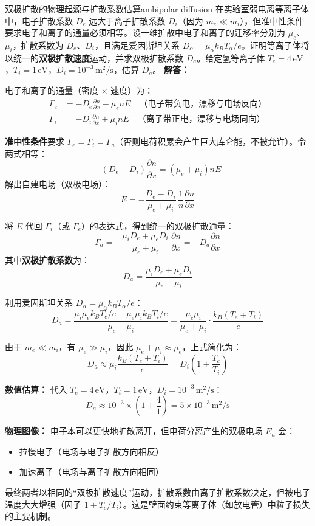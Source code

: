 \begin{example}{双极扩散的物理起源与扩散系数估算}{ambipolar-diffusion}
在实验室弱电离等离子体中，电子扩散系数 $D_e$ 远大于离子扩散系数 $D_i$（因为 $m_e\ll m_i$），但准中性条件要求电子和离子的通量必须相等。设一维扩散中电子和离子的迁移率分别为 $\mu_e$、$\mu_i$，扩散系数为 $D_e$、$D_i$，且满足爱因斯坦关系 $D_\alpha = \mu_\alpha k_{\!B}T_\alpha/e$。证明等离子体将以统一的\textbf{双极扩散速度}运动，并求双极扩散系数 $D_a$。给定氢等离子体 $T_e=4\,\mathrm{eV}$，$T_i=1\,\mathrm{eV}$，$D_i=10^{-3}\,\mathrm{m^2/s}$，估算 $D_a$。
\tcblower
\textbf{解答：}

电子和离子的通量（密度 $\times$ 速度）为：
\begin{align*}
\Gamma_e &= -D_e\frac{\partial n}{\partial x} - \mu_e n E \quad \text{（电子带负电，漂移与电场反向）}\\
\Gamma_i &= -D_i\frac{\partial n}{\partial x} + \mu_i n E \quad \text{（离子带正电，漂移与电场同向）}
\end{align*}

\textbf{准中性条件}要求 $\Gamma_e = \Gamma_i = \Gamma_a$（否则电荷积累会产生巨大库仑能，不被允许）。令两式相等：
\[
-(D_e - D_i)\frac{\partial n}{\partial x} = (\mu_e + \mu_i)nE
\]
解出自建电场（双极电场）：
\[
E = -\frac{D_e - D_i}{\mu_e + \mu_i}\,\frac{1}{n}\frac{\partial n}{\partial x}
\]

将 $E$ 代回 $\Gamma_i$（或 $\Gamma_e$）的表达式，得到统一的双极扩散通量：
\[
\Gamma_a = -\frac{\mu_i D_e + \mu_e D_i}{\mu_e + \mu_i}\,\frac{\partial n}{\partial x} = -D_a\frac{\partial n}{\partial x}
\]
其中\textbf{双极扩散系数}为：
\[
D_a = \frac{\mu_i D_e + \mu_e D_i}{\mu_e + \mu_i}
\]

利用爱因斯坦关系 $D_\alpha = \mu_\alpha k_{\!B}T_\alpha/e$：
\[
D_a = \frac{\mu_i\mu_e k_{\!B}T_e/e + \mu_e\mu_i k_{\!B}T_i/e}{\mu_e + \mu_i} = \frac{\mu_e\mu_i}{\mu_e + \mu_i}\cdot\frac{k_{\!B}(T_e + T_i)}{e}
\]

由于 $m_e\ll m_i$，有 $\mu_e\gg\mu_i$，因此 $\mu_e + \mu_i \approx \mu_e$，上式简化为：
\[
D_a \approx \mu_i\frac{k_{\!B}(T_e + T_i)}{e} = D_i\left(1 + \frac{T_e}{T_i}\right)
\]

\textbf{数值估算：} 代入 $T_e=4\,\mathrm{eV}$，$T_i=1\,\mathrm{eV}$，$D_i=10^{-3}\,\mathrm{m^2/s}$：
\[
D_a \approx 10^{-3}\times\left(1 + \frac{4}{1}\right) = 5\times 10^{-3}\,\mathrm{m^2/s}
\]

\textbf{物理图像：} 电子本可以更快地扩散离开，但电荷分离产生的双极电场 $E_a$ 会：
\begin{itemize}[leftmargin=*,itemsep=0pt]
\item 拉慢电子（电场与电子扩散方向相反）
\item 加速离子（电场与离子扩散方向相同）
\end{itemize}
最终两者以相同的“双极扩散速度”运动，扩散系数由离子扩散系数决定，但被电子温度大大增强（因子 $1+T_e/T_i$）。这是壁面约束等离子体（如放电管）中粒子损失的主要机制。
\end{example}

